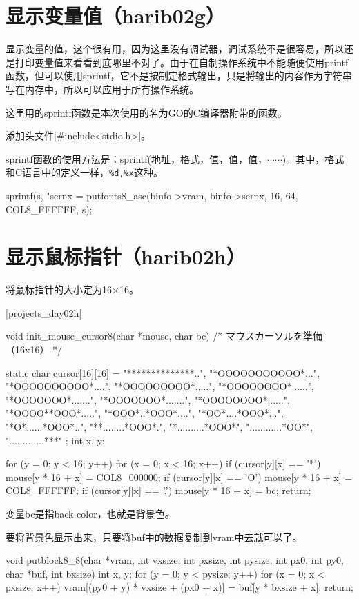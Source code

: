 \section{	显示变量值（harib02g）	}
显示变量的值，这个很有用，因为这里没有调试器，调试系统不是很容易，所以还是打印变量值来看看到底哪里不对了。由于在自制操作系统中不能随便使用printf函数，但可以使用sprintf，它不是按制定格式输出，只是将输出的内容作为字符串写在内存中，所以可以应用于所有操作系统。

这里用的sprintf函数是本次使用的名为GO的C编译器附带的函数。

\cs

添加头文件|#include<stdio.h>|。

sprintf函数的使用方法是：sprintf(地址，格式，值，值，值，$\cdots\cdots$)。其中，格式和C语言中的定义一样，\verb|%d,%x|这种。
\begin{code}
    sprintf(s, "scrnx = %
	putfonts8_asc(binfo->vram, binfo->scrnx, 16, 64, COL8_FFFFFF, s);
\end{code}

\section{	显示鼠标指针（harib02h）	}
将鼠标指针的大小定为16$\times$16。

\dag|projects_day\harib02h|
\begin{code}[label=bootpack.c]
void init_mouse_cursor8(char *mouse, char bc)
/* マウスカーソルを準備（16x16） */
{
	static char cursor[16][16] = {
		"**************..",
		"*OOOOOOOOOOO*...",
		"*OOOOOOOOOO*....",
		"*OOOOOOOOO*.....",
		"*OOOOOOOO*......",
		"*OOOOOOO*.......",
		"*OOOOOOO*.......",
		"*OOOOOOOO*......",
		"*OOOO**OOO*.....",
		"*OOO*..*OOO*....",
		"*OO*....*OOO*...",
		"*O*......*OOO*..",
		"**........*OOO*.",
		"*..........*OOO*",
		"............*OO*",
		".............***"
	};
	int x, y;

	for (y = 0; y < 16; y++) {
		for (x = 0; x < 16; x++) {
			if (cursor[y][x] == '*') {
				mouse[y * 16 + x] = COL8_000000;
			}
			if (cursor[y][x] == 'O') {
				mouse[y * 16 + x] = COL8_FFFFFF;
			}
			if (cursor[y][x] == '.') {
				mouse[y * 16 + x] = bc;
			}
		}
	}
	return;
}
\end{code}

变量bc是指back-color，也就是背景色。

要将背景色显示出来，只要将buf中的数据复制到vram中去就可以了。
\begin{code}[label=bootpack.c]
void putblock8_8(char *vram, int vxsize, int pxsize,
	int pysize, int px0, int py0, char *buf, int bxsize)
{
	int x, y;
	for (y = 0; y < pysize; y++) {
		for (x = 0; x < pxsize; x++) {
			vram[(py0 + y) * vxsize + (px0 + x)] = buf[y * bxsize + x];
		}
	}
	return;
}
\end{code}

